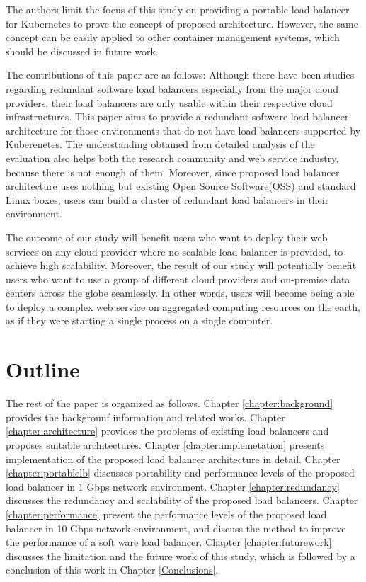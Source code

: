 The authors limit the focus of this study on providing a portable load balancer for Kubernetes to prove the concept of proposed architecture.
However, the same concept can be easily applied to other container management systems, which should be discussed in future work.

The contributions of this paper are as follows:
Although there have been studies regarding redundant software load balancers especially from the major cloud providers\cite{eisenbud2016maglev,patel2013ananta}, their load balancers are only usable within their respective cloud infrastructures.
This paper aims to provide a redundant software load balancer architecture for those environments that do not have load balancers supported by Kuberenetes.
The understanding obtained from detailed analysis of the evaluation also helps both the research community and web service industry, because there is not enough of them.
Moreover, since proposed load balancer architecture uses nothing but existing Open Source Software(OSS) and standard Linux boxes, users can build a cluster of redundant load balancers in their environment.

The outcome of our study will benefit users who want to deploy their web services on any cloud provider where no scalable load balancer is provided, to achieve high scalability.
Moreover, the result of our study will potentially benefit users who want to use a group of different cloud providers and on-premise data centers across the globe seamlessly.
In other words, users will become being able to deploy a complex web service on aggregated computing resources on the earth, as if they were starting a single process on a single computer.

\section{Outline}

The rest of the paper is organized as follows.
Chapter \ref{chapter:background} provides the backgrounf information and related works.
Chapter \ref{chapter:architecture} provides the problems of existing load balancers and proposes suitable architectures.
Chapter \ref{chapter:implemetation} presents implementation of the proposed load balancer architecture in detail.
Chapter \ref{chapter:portablelb} discusses portability and performance levels of the proposed load balancer in 1 Gbps network environment.
Chapter \ref{chapter:redundancy} discusses the redundancy and scalability of the proposed load balancers.
Chapter \ref{chapter:performance} present the performance levels of the proposed load balancer in 10 Gbps network environment, and discuss the method to improve the performance of a soft ware load balancer.
Chapter \ref{chapter:futurework} discusses the limitation and the future work of this study, 
which is followed by a conclusion of this work in Chapter \ref{Conclusions}.





